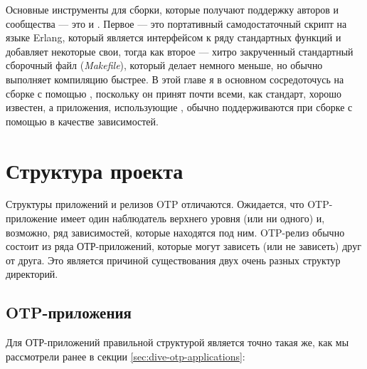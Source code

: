 Основные инструменты для сборки, которые получают поддержку авторов и сообщества --- это  и . Первое --- это портативный самодостаточный скрипт на языке Erlang, который является интерфейсом к ряду стандартных функций и добавляет некоторые свои, тогда как второе --- хитро закрученный стандартный сборочный файл (\emph{Makefile}), который делает немного меньше, но обычно выполняет компиляцию быстрее. В этой главе я в основном сосредоточусь на сборке с помощью , поскольку он принят почти всеми, как стандарт, хорошо известен, а приложения, использующие , обычно поддерживаются при сборке с помощью  в качестве зависимостей.


\section{Структура проекта}
\label{sec:project-structure}

Структуры приложений и релизов OTP отличаются. Ожидается, что OTP-приложение имеет один наблюдатель верхнего уровня (или ни одного) и, возможно, ряд зависимостей, которые находятся под ним. OTP-релиз обычно состоит из ряда ОТР-приложений, которые могут зависеть (или не зависеть) друг от друга. Это является причиной существования двух очень разных структур директорий.

\subsection{OTP-приложения}
\label{subsec:building-otp-applications}

Для ОТР-приложений правильной структурой является точно такая же, как мы рассмотрели ранее в секции \ref{sec:dive-otp-applications}:

